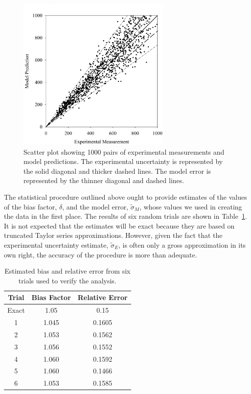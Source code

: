 \begin{figure}[ht]
\begin{center}
\includegraphics[height=3.0in]{FIGURES/scatterplot_1000}
\end{center}
\caption[Scatter plot for verification of model error calculation.]{Scatter plot showing 1000 pairs of experimental measurements and model predictions. The
experimental uncertainty is represented by the solid diagonal and thicker dashed lines. The model error is represented by the thinner diagonal and dashed lines.}
\label{scatterplot_1000}
\end{figure}
The statistical procedure outlined above ought to provide estimates of the values of the bias factor, $\delta$, and the model error, $\widetilde{\sigma}_M$, whose
values we used in creating the data in the first place. The results of six random trials are shown in Table~\ref{trials}. It is not expected that the
estimates will be exact because they are based on truncated Taylor series approximations. However, given the fact that the experimental uncertainty estimate,
$\widetilde{\sigma}_E$, is often only a gross approximation in its own right, the accuracy of the procedure is more than adequate.
\begin{table}[ht!]
\caption{Estimated bias and relative error from six trials used to verify the analysis. }
\begin{center}
\begin{tabular}{|c|c|c|}
\hline
Trial   & Bias Factor      & Relative Error \\ \hline \hline
Exact   & 1.05             &    0.15            \\ \hline \hline
1       & 1.045            &    0.1605            \\ \hline
2       & 1.053            &    0.1562            \\ \hline
3       & 1.056            &    0.1552            \\ \hline
4       & 1.060            &    0.1592            \\ \hline
5       & 1.060            &    0.1466            \\ \hline
6       & 1.053            &    0.1585            \\ \hline
\end{tabular}
\end{center}
\label{trials}
\end{table}



